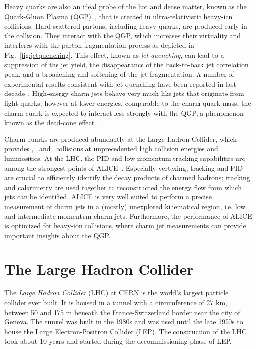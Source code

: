\documentclass[12pt, a4paper, twoside, titlepage]{article}
\begin{document}
Heavy quarks are also an ideal probe of the hot and dense matter, known as the Quark-Gluon Plasma (QGP)~\cite{STAR:2005a, PHENIX:2005a, ALICE:2010b, ALICE:2011b, CMS:2013d, ATLAS:2013c}, 
that is created in ultra-relativistic heavy-ion collisions. 
Hard scattered partons, including heavy quarks, are produced early in the collision. They interact with the QGP, which increases their virtuality and interferes with the
parton fragmentation process as depicted in Fig.~\ref{fig:jetquenching}. 
This effect, known as \emph{jet quenching}, can lead to a suppression of the jet yield, the disappearance of the back-to-back jet correlation peak,
and a broadening and softening of the jet fragmentation. 
A number of experimental results consistent with jet quenching have been reported in last decade~\cite{PHENIX:2003a, PHENIX:2008b, STAR:2003b, STAR:2003c, STAR:2006a, ALICE:2010d, CMS:2011c, CMS:2012b, ATLAS:2014d, ALICE:2015a}.
High-energy charm jets behave very much like jets that originate from light quarks; however at lower energies, comparable to the charm quark mass, the charm quark is expected
to interact less strongly with the QGP, a phenomenon known as the dead-cone effect~\cite{Dokshitzer:2001}.

Charm quarks are produced abundantly at the Large Hadron Collider, which provides \pp, \pPb\ and \PbPb\ collisions at unprecedented high collision energies and luminosities.
At the LHC, the PID and low-momentum tracking capabilities are among the strongest points of ALICE~\cite{ALICE:2014b}.
Especially vertexing, tracking and PID are crucial to efficiently identify the decay products of charmed hadrons; tracking and calorimetry are used together to reconstructed the energy flow from which jets can be identified.
ALICE is very well suited to perform a precise measurement of charm jets in a (mostly) unexplored kinematical region, i.e. low and intermediate momentum charm jets. Furthermore, the performance of ALICE
is optimized for heavy-ion collisions, where charm jet measurements can provide important insights about the QGP.

\section{The Large Hadron Collider}
The \emph{Large Hadron Collider} (LHC) at CERN is the world's largest particle collider ever built.
It is housed in a tunnel with a circumference of 27 km, between 50 and 175 m beneath
the France-Switzerland border near the city of Geneva. The tunnel was built in the 1980s and was used until 
the late 1990s to house the Large Electron-Positron Collider (LEP). The construction of the LHC took about 10 years and started
during the decommissioning phase of LEP. 
\end{document}
